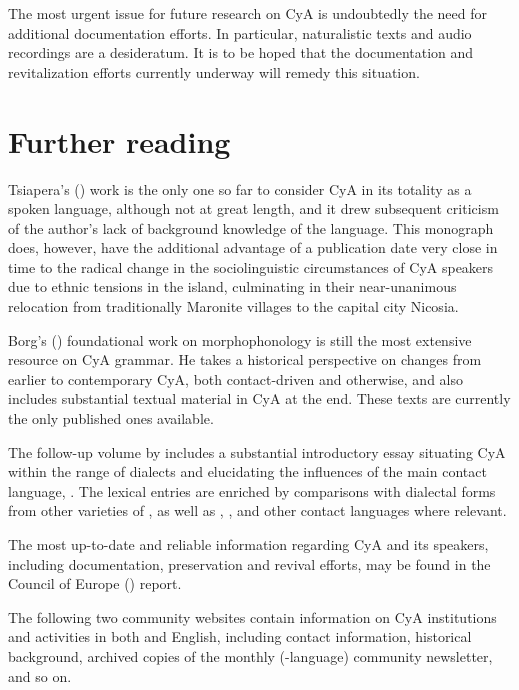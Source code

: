 \documentclass[output=paper]{langsci/langscibook}
\begin{document}
The most urgent issue for {future} research on CyA is undoubtedly the need for additional documentation efforts. In particular, naturalistic texts and audio recordings are a desideratum. It is to be hoped that the documentation and revitalization efforts currently underway will remedy this situation.

\section*{Further reading}\label{FR}

Tsiapera's (\citeyear{Tsiapera1969}) work is the only one so far to consider CyA in its totality as a spoken language, although not at great length, and it drew subsequent criticism of the author’s lack of background knowledge of the  language. This monograph does, however, have the additional advantage of a publication date very close in time to the radical change in the sociolinguistic circumstances of CyA speakers due to ethnic tensions in the island, culminating in their near-unanimous relocation from traditionally Maronite villages to the capital city Nicosia.

Borg's (\citeyear{Borg1985}) foundational work on morphophonology is still the most extensive resource on CyA grammar. He takes a historical perspective on changes from earlier  to contemporary CyA, both contact-driven and otherwise, and also includes substantial textual material in CyA at the end. These texts are currently the only published ones available.

The follow-up volume by \citet{Borg2004} includes a substantial introductory essay situating CyA within the range of  dialects and elucidating the influences of the main contact language, . The lexical entries are enriched by comparisons with dialectal forms from other varieties of , as well as , , and other contact languages where relevant.

The most up-to-date and reliable information regarding CyA and its speakers, including documentation, preservation and revival efforts, may be found in the Council of Europe (\citeyear{CouncilofEurope2017}) report.


The following two community websites contain information on CyA institutions and activities in both  and English, including contact information, historical background, archived copies of the monthly (-language) community newsletter, and so on.
\end{document}
